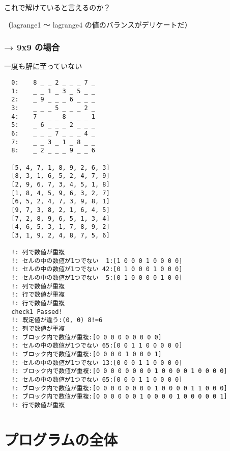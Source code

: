 \documentclass[uplatex,dvipdfmx,a4paper,11pt,oneside,openany]{jsbook}
\begin{document}
これで解けていると言えるのか？

（lagrange1 〜 lagrange4 の値のバランスがデリケートだ）

\subsubsection{→ 9x9 の場合}

一度も解に至っていない

\begin{verbatim}
  0:	8 _ _ 2 _ _ _ 7 _
  1:	_ _ 1 _ 3 _ 5 _ _
  2:	_ 9 _ _ _ 6 _ _ _
  3:	_ _ _ 5 _ _ _ 2 _
  4:	7 _ _ _ 8 _ _ _ 1
  5:	_ 6 _ _ _ 2 _ _ _
  6:	_ _ _ 7 _ _ _ 4 _
  7:	_ _ 3 _ 1 _ 8 _ _
  8:	_ 2 _ _ _ 9 _ _ 6

  [5, 4, 7, 1, 8, 9, 2, 6, 3]
  [8, 3, 1, 6, 5, 2, 4, 7, 9]
  [2, 9, 6, 7, 3, 4, 5, 1, 8]
  [1, 8, 4, 5, 9, 6, 3, 2, 7]
  [6, 5, 2, 4, 7, 3, 9, 8, 1]
  [9, 7, 3, 8, 2, 1, 6, 4, 5]
  [7, 2, 8, 9, 6, 5, 1, 3, 4]
  [4, 6, 5, 3, 1, 7, 8, 9, 2]
  [3, 1, 9, 2, 4, 8, 7, 5, 6]

  !: 列で数値が重複
  !: セルの中の数値が1つでない  1:[1 0 0 0 1 0 0 0 0]
  !: セルの中の数値が1つでない 42:[0 1 0 0 0 1 0 0 0]
  !: セルの中の数値が1つでない  5:[0 1 0 0 0 0 1 0 0]
  !: 列で数値が重複
  !: 行で数値が重複
  !: 行で数値が重複
  check1 Passed!
  !: 既定値が違う:(0, 0) 8!=6
  !: 列で数値が重複
  !: ブロック内で数値が重複:[0 0 0 0 0 0 0 0 0]
  !: セルの中の数値が1つでない 65:[0 0 1 1 0 0 0 0 0]
  !: ブロック内で数値が重複:[0 0 0 0 1 0 0 0 1]
  !: セルの中の数値が1つでない 13:[0 0 0 1 1 0 0 0 0]
  !: ブロック内で数値が重複:[0 0 0 0 0 0 0 0 1 0 0 0 0 1 0 0 0 0]
  !: セルの中の数値が1つでない 65:[0 0 0 1 1 0 0 0 0]
  !: ブロック内で数値が重複:[0 0 0 0 0 0 0 0 1 0 0 0 0 1 1 0 0 0]
  !: ブロック内で数値が重複:[0 0 0 0 0 0 1 0 0 0 0 1 0 0 0 0 0 1]
  !: 行で数値が重複
\end{verbatim}

\section{プログラムの全体}


\end{document}
